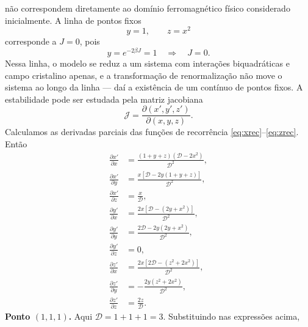 \documentclass[12pt,a4paper]{article}
\newcommand{\pd}[2]{\frac{\partial #1}{\partial #2}}
\begin{document}
não correspondem diretamente ao domínio ferromagnético físico
considerado inicialmente.
%
A linha de pontos fixos
%
\begin{equation}
    y=1,\qquad z=x^2
\end{equation}
%
corresponde a \(J=0\), pois
%
\begin{equation}
    y=e^{-2\beta J}=1
    \quad\Longrightarrow\quad
    J=0.
\end{equation}
%
Nessa linha, o modelo se reduz a um sistema com interações biquadráticas e campo cristalino apenas, e a transformação de renormalização não move o sistema ao longo da linha — daí a existência de um contínuo de pontos fixos. A estabilidade pode ser estudada pela matriz jacobiana
%
\begin{equation}
    \mathcal J
    =
    \frac{\partial(x',y',z')}
         {\partial(x,y,z)}.
    \label{eq:jacobian_p4}
\end{equation}
%
Calculamos as derivadas parciais das funções de recorrência
\eqref{eq:xrec}--\eqref{eq:zrec}. 
%
Então
%
\begin{align}
    \pd{x'}{x}
    &=
    \frac{(1+y+z)(\mathcal D-2x^2)}{\mathcal D^2},
    \label{eq:dxdx_p4}
    \\[4pt]
    \pd{x'}{y}
    &=
    \frac{x[\mathcal D-2y(1+y+z)]}{\mathcal D^2},
    \label{eq:dxdy_p4}
    \\[4pt]
    \pd{x'}{z}
    &=
    \frac{x}{\mathcal D},
    \label{eq:dxdz_p4}
    \\[4pt]
    \pd{y'}{x}
    &=
    \frac{2x[\mathcal D-(2y+x^2)]}{\mathcal D^2},
    \label{eq:dydx_p4}
    \\[4pt]
    \pd{y'}{y}
    &=
    \frac{2\mathcal D-2y(2y+x^2)}{\mathcal D^2},
    \label{eq:dydy_p4}
    \\[4pt]
    \pd{y'}{z}
    &=
    0,
    \label{eq:dydz_p4}
    \\[4pt]
    \pd{z'}{x}
    &=
    \frac{2x[2\mathcal D-(z^2+2x^2)]}{\mathcal D^2},
    \label{eq:dzdx_p4}
    \\[4pt]
    \pd{z'}{y}
    &=
    -\frac{2y(z^2+2x^2)}{\mathcal D^2},
    \label{eq:dzdy_p4}
    \\[4pt]
    \pd{z'}{z}
    &=
    \frac{2z}{\mathcal D}.
    \label{eq:dzdz_p4}
\end{align}
%
\noindent\textbf{Ponto \((1,1,1)\).}
%
Aqui \(\mathcal D=1+1+1=3\). Substituindo nas expressões acima,
%
\end{document}
